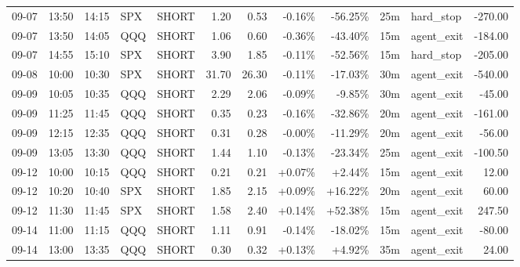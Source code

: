 \documentclass[11pt,a4paper]{article}
\begin{document}
\begin{center}
\begin{longtable}{>{\color{txtmain}}l l l l l r r r r r >{\color{txtmain}}l r}
09-07 & 13:50 & 14:15 & SPX & SHORT & 1.20 & 0.53 & \textcolor{lossred}{-0.16\%} & \textcolor{lossred}{-56.25\%} & 25m & hard\_stop & \textcolor{lossred}{-270.00} \\
09-07 & 13:50 & 14:05 & QQQ & SHORT & 1.06 & 0.60 & \textcolor{lossred}{-0.36\%} & \textcolor{lossred}{-43.40\%} & 15m & agent\_exit & \textcolor{lossred}{-184.00} \\
09-07 & 14:55 & 15:10 & SPX & SHORT & 3.90 & 1.85 & \textcolor{lossred}{-0.11\%} & \textcolor{lossred}{-52.56\%} & 15m & hard\_stop & \textcolor{lossred}{-205.00} \\
09-08 & 10:00 & 10:30 & SPX & SHORT & 31.70 & 26.30 & \textcolor{lossred}{-0.11\%} & \textcolor{lossred}{-17.03\%} & 30m & agent\_exit & \textcolor{lossred}{-540.00} \\
09-09 & 10:05 & 10:35 & QQQ & SHORT & 2.29 & 2.06 & \textcolor{lossred}{-0.09\%} & \textcolor{lossred}{-9.85\%} & 30m & agent\_exit & \textcolor{lossred}{-45.00} \\
09-09 & 11:25 & 11:45 & QQQ & SHORT & 0.35 & 0.23 & \textcolor{lossred}{-0.16\%} & \textcolor{lossred}{-32.86\%} & 20m & agent\_exit & \textcolor{lossred}{-161.00} \\
09-09 & 12:15 & 12:35 & QQQ & SHORT & 0.31 & 0.28 & \textcolor{wingreen}{-0.00\%} & \textcolor{lossred}{-11.29\%} & 20m & agent\_exit & \textcolor{lossred}{-56.00} \\
09-09 & 13:05 & 13:30 & QQQ & SHORT & 1.44 & 1.10 & \textcolor{lossred}{-0.13\%} & \textcolor{lossred}{-23.34\%} & 25m & agent\_exit & \textcolor{lossred}{-100.50} \\
09-12 & 10:00 & 10:15 & QQQ & SHORT & 0.21 & 0.21 & \textcolor{wingreen}{+0.07\%} & \textcolor{wingreen}{+2.44\%} & 15m & agent\_exit & \textcolor{wingreen}{12.00} \\
09-12 & 10:20 & 10:40 & SPX & SHORT & 1.85 & 2.15 & \textcolor{wingreen}{+0.09\%} & \textcolor{wingreen}{+16.22\%} & 20m & agent\_exit & \textcolor{wingreen}{60.00} \\
09-12 & 11:30 & 11:45 & SPX & SHORT & 1.58 & 2.40 & \textcolor{wingreen}{+0.14\%} & \textcolor{wingreen}{+52.38\%} & 15m & agent\_exit & \textcolor{wingreen}{247.50} \\
09-14 & 11:00 & 11:15 & QQQ & SHORT & 1.11 & 0.91 & \textcolor{lossred}{-0.14\%} & \textcolor{lossred}{-18.02\%} & 15m & agent\_exit & \textcolor{lossred}{-80.00} \\
09-14 & 13:00 & 13:35 & QQQ & SHORT & 0.30 & 0.32 & \textcolor{wingreen}{+0.13\%} & \textcolor{wingreen}{+4.92\%} & 35m & agent\_exit & \textcolor{wingreen}{24.00} \\

\end{longtable}
\end{center}
\end{document}
